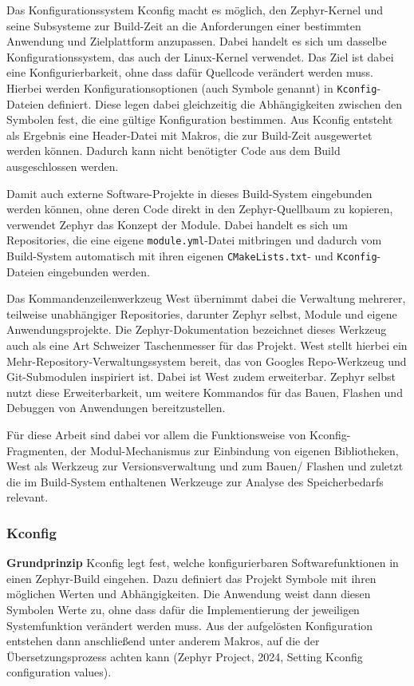 Das Konfigurationssystem Kconfig macht es m{\"o}glich, den Zephyr-Kernel und seine Subsysteme zur Build-Zeit an die Anforderungen einer bestimmten Anwendung und Zielplattform anzupassen. Dabei handelt es sich um dasselbe Konfigurationssystem, das auch der Linux-Kernel verwendet. Das Ziel ist dabei eine Konfigurierbarkeit, ohne dass daf{\"u}r Quellcode ver{\"a}ndert werden muss. Hierbei werden Konfigurationsoptionen (auch \glqq{}Symbole\grqq{} genannt) in \lstinline[style=fileinline]|Kconfig|-Dateien definiert. Diese legen dabei gleichzeitig die Abh{\"a}ngigkeiten zwischen den Symbolen fest, die eine g{\"u}ltige Konfiguration bestimmen. Aus Kconfig entsteht als Ergebnis eine Header-Datei mit Makros, die zur Build-Zeit ausgewertet werden k{\"o}nnen. Dadurch kann nicht ben{\"o}tigter Code aus dem Build ausgeschlossen werden.

Damit auch externe Software-Projekte in dieses Build-System eingebunden werden k{\"o}nnen, ohne deren Code direkt in den Zephyr-Quellbaum zu kopieren, verwendet Zephyr das Konzept der Module. Dabei handelt es sich um Repositories, die eine eigene \lstinline[style=fileinline]|module.yml|-Datei mitbringen und dadurch vom Build-System automatisch mit ihren eigenen \lstinline[style=fileinline]|CMakeLists.txt|- und \lstinline[style=fileinline]|Kconfig|-Dateien eingebunden werden.

Das Kommandenzeilenwerkzeug West {\"u}bernimmt dabei die Verwaltung mehrerer, teilweise unabh{\"a}ngiger Repositories, darunter Zephyr selbst, Module und eigene Anwendungsprojekte. Die Zephyr-Dokumentation bezeichnet dieses Werkzeug auch als eine Art \glqq{}Schweizer Taschenmesser\grqq{} f{\"u}r das Projekt. West stellt hierbei ein Mehr-Repository-Verwaltungssystem bereit, das von Googles Repo-Werkzeug und Git-Submodulen inspiriert ist. Dabei ist West zudem erweiterbar. Zephyr selbst nutzt diese Erweiterbarkeit, um weitere Kommandos f{\"u}r das Bauen, Flashen und Debuggen von Anwendungen bereitzustellen.

F{\"u}r diese Arbeit sind dabei vor allem die Funktionsweise von Kconfig-Fragmenten, der Modul-Mechanismus zur Einbindung von eigenen Bibliotheken, West als Werkzeug zur Versionsverwaltung und zum Bauen/ Flashen und zuletzt die im Build-System enthaltenen Werkzeuge zur Analyse des Speicherbedarfs relevant.

\subsubsection{Kconfig}
\textbf{Grundprinzip} Kconfig legt fest, welche konfigurierbaren Softwarefunktionen in einen Zephyr-Build eingehen. Dazu definiert das Projekt Symbole mit ihren m{\"o}glichen Werten und Abh{\"a}ngigkeiten. Die Anwendung weist dann diesen Symbolen Werte zu, ohne dass daf{\"u}r die Implementierung der jeweiligen Systemfunktion ver{\"a}ndert werden muss. Aus der aufgel{\"o}sten Konfiguration entstehen dann anschlie{\ss}end unter anderem Makros, auf die der {\"U}bersetzungsprozess achten kann (Zephyr Project, 2024, \glqq{}Setting Kconfig configuration values\grqq{}).

